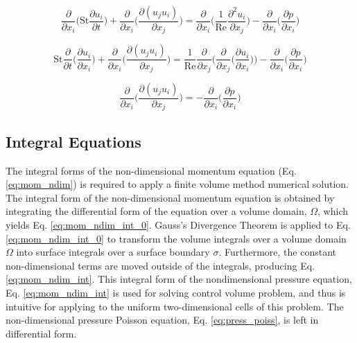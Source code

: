 \documentclass[10pt, letterpaper]{article}
\begin{document}
\begin{equation}
  \frac{\partial}{\partial{x_{i}}}\bigg(\text{St}\frac{\partial{u_{i}}}{\partial{t}}\bigg) + \frac{\partial}{\partial{x_{i}}}\bigg(\frac{\partial{(u_{j}u_{i})}}{\partial{x_{j}}}\bigg) =\frac{\partial}{\partial{x_{i}}}\bigg(\frac{1}{\text{Re}}\frac{\partial^{2}{u_{i}}}{\partial{x_{j}}}\bigg) -\frac{\partial}{\partial{x_{i}}}\bigg(\frac{\partial{p}}{\partial{x_{i}}}\bigg)
  \label{eq:mom_ndim_div}
\end{equation}


\begin{equation}
  \text{St}\frac{\partial}{\partial{t}}\bigg(\frac{\partial{u_{i}}}{\partial{x_{i}}}\bigg) + \frac{\partial}{\partial{x_{i}}}\bigg(\frac{\partial{(u_{j}u_{i})}}{\partial{x_{j}}}\bigg) = \frac{1}{\text{Re}}\frac{\partial}{\partial{x_{j}}}\bigg(\frac{\partial}{\partial{x_{j}}}\bigg(\frac{\partial{u_{i}}}{\partial{x_{i}}}\bigg)\bigg) -\frac{\partial}{\partial{x_{i}}}\bigg(\frac{\partial{p}}{\partial{x_{i}}}\bigg)
  \label{eq:mom_ndim_div_simp}
\end{equation}

\begin{equation}
  \boxed{
    \frac{\partial}{\partial{x_{i}}}\bigg(\frac{\partial(u_{j}u_{i})}{\partial{x_{j}}}\bigg) = - \frac{\partial}{\partial{x_{i}}}\bigg(\frac{\partial{p}}{\partial{x_{i}}}\bigg)
  }
  \label{eq:press_poiss}
\end{equation}

\subsection{Integral Equations}

The integral forms of the non-dimensional momentum equation (Eq. \ref{eq:mom_ndim}) is required to apply a finite volume method numerical solution. The integral form of the non-dimensional momentum equation is obtained by integrating the differential form of the equation over a volume domain, $\Omega$, which yields Eq. \ref{eq:mom_ndim_int_0}. Gauss's Divergence Theorem is applied to Eq. \ref{eq:mom_ndim_int_0} to transform the volume integrals over a volume domain $\Omega$ into surface integrals over a surface boundary $\sigma$. Furthermore, the constant non-dimensional terms are moved outside of the integrals, producing Eq. \ref{eq:mom_ndim_int}. This integral form of the nondimensional pressure equation, Eq. \ref{eq:mom_ndim_int} is used for solving control volume problem, and thus is intuitive for applying to the uniform two-dimensional cells of this problem. The non-dimensional pressure Poisson equation, Eq. \ref{eq:press_poiss}, is left in differential form. 
\end{document}
